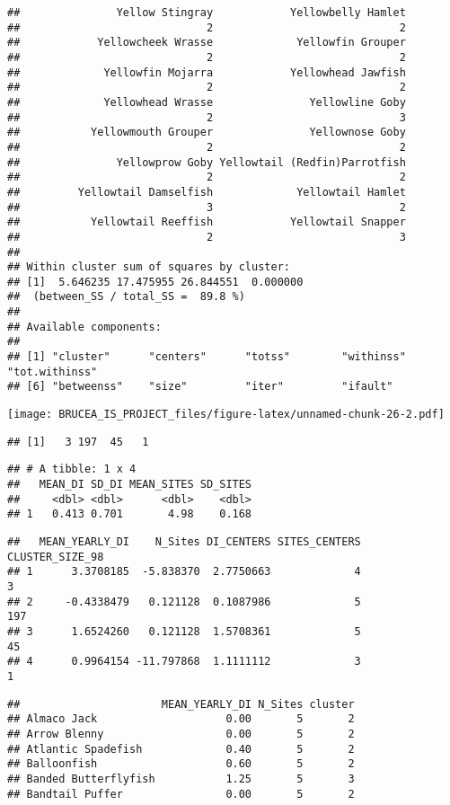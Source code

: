 \documentclass[
]{article}
\begin{document}
\begin{verbatim}
##               Yellow Stingray            Yellowbelly Hamlet 
##                             2                             2 
##            Yellowcheek Wrasse             Yellowfin Grouper 
##                             2                             2 
##             Yellowfin Mojarra            Yellowhead Jawfish 
##                             2                             2 
##             Yellowhead Wrasse               Yellowline Goby 
##                             2                             3 
##           Yellowmouth Grouper               Yellownose Goby 
##                             2                             2 
##               Yellowprow Goby Yellowtail (Redfin)Parrotfish 
##                             2                             2 
##         Yellowtail Damselfish             Yellowtail Hamlet 
##                             3                             2 
##           Yellowtail Reeffish            Yellowtail Snapper 
##                             2                             3 
## 
## Within cluster sum of squares by cluster:
## [1]  5.646235 17.475955 26.844551  0.000000
##  (between_SS / total_SS =  89.8 %)
## 
## Available components:
## 
## [1] "cluster"      "centers"      "totss"        "withinss"     "tot.withinss"
## [6] "betweenss"    "size"         "iter"         "ifault"
\end{verbatim}

\texttt{[image: BRUCEA\_IS\_PROJECT\_files/figure-latex/unnamed-chunk-26-2.pdf]}

\begin{verbatim}
## [1]   3 197  45   1
\end{verbatim}

\begin{verbatim}
## # A tibble: 1 x 4
##   MEAN_DI SD_DI MEAN_SITES SD_SITES
##     <dbl> <dbl>      <dbl>    <dbl>
## 1   0.413 0.701       4.98    0.168
\end{verbatim}

\begin{verbatim}
##   MEAN_YEARLY_DI    N_Sites DI_CENTERS SITES_CENTERS CLUSTER_SIZE_98
## 1      3.3708185  -5.838370  2.7750663             4               3
## 2     -0.4338479   0.121128  0.1087986             5             197
## 3      1.6524260   0.121128  1.5708361             5              45
## 4      0.9964154 -11.797868  1.1111112             3               1
\end{verbatim}

\begin{verbatim}
##                      MEAN_YEARLY_DI N_Sites cluster
## Almaco Jack                    0.00       5       2
## Arrow Blenny                   0.00       5       2
## Atlantic Spadefish             0.40       5       2
## Balloonfish                    0.60       5       2
## Banded Butterflyfish           1.25       5       3
## Bandtail Puffer                0.00       5       2
\end{verbatim}
\end{document}
